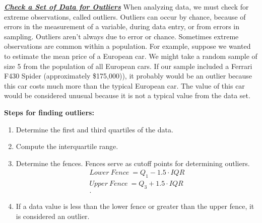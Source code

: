 \documentclass{report}
\begin{document}
    \bigbreak \noindent \bigbreak \noindent 
    \textbf{\textit{\underline{Check a Set of Data for Outliers}}}
    \bigbreak \noindent 
    When analyzing data, we must check for extreme observations, called outliers. Outliers can occur by chance, because of errors in the measurement of a variable, during data entry, or from errors in sampling.
    \bigbreak \noindent 
    Outliers aren't always due to error or chance. Sometimes extreme observations are common within a population. For example, suppose we wanted to estimate the mean price of a European car. We might take a random sample of size 5 from the population of all European cars. If our sample included a Ferrari F430 Spider (approximately \$175,000)), it probably would be an outlier because this car costs much more than the typical European car. The value of this car would be considered unusual because it is not a typical value from the data set.

    \bigbreak \noindent 
    \textbf{Steps for finding outliers:}
    \begin{enumerate}
        \item Determine the first and third quartiles of the data.
        \item Compute the interquartile range.
        \item Determine the fences. Fences serve as cutoff points for determining outliers.
            \begin{align*}
                Lower\ Fence\ = Q_{1} - 1.5\cdot IQR \\
                Upper\ Fence\ = Q_{3} + 1.5\cdot IQR \\
            .\end{align*}
        \item If a data value is less than the lower fence or greater than the upper fence, it is considered an outlier.

    \end{enumerate}
    \bigbreak \noindent 

    \pagebreak \bigbreak \noindent
\end{document}
